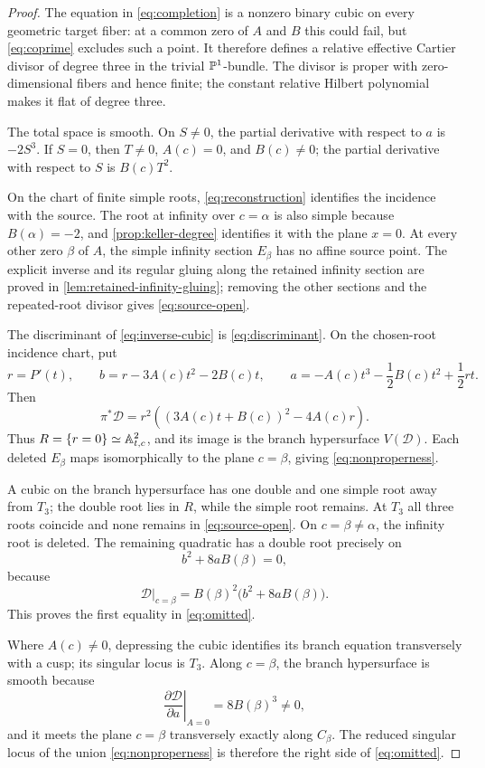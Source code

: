 \documentclass[11pt,reqno]{amsart}
\begin{document}
\begin{proof}
The equation in \eqref{eq:completion} is a nonzero binary cubic on every
geometric target fiber: at a common zero of \(A\) and \(B\) this could fail,
but \eqref{eq:coprime} excludes such a point.  It therefore defines a
relative effective Cartier divisor of degree three in the trivial
\(\mathbb P^1\)-bundle.  The divisor is proper with zero-dimensional fibers and
hence finite; the constant relative Hilbert polynomial makes it flat of
degree three.

The total space is smooth.  On \(S\ne0\), the partial derivative with
respect to \(a\) is \(-2S^3\).  If \(S=0\), then \(T\ne0\), \(A(c)=0\),
and \(B(c)\ne0\); the partial derivative with respect to \(S\) is
\(B(c)T^2\).

On the chart of finite simple roots, \eqref{eq:reconstruction} identifies
the incidence with the source.  The root at infinity over \(c=\alpha\) is
also simple because \(B(\alpha)=-2\), and
\cref{prop:keller-degree} identifies it with the plane \(x=0\).  At every
other zero \(\beta\) of \(A\), the simple infinity section \(E_\beta\) has
no affine source point.  The explicit inverse and its regular gluing along
the retained infinity section are proved in
\cref{lem:retained-infinity-gluing}; removing the other sections and the
repeated-root divisor gives \eqref{eq:source-open}.

The discriminant of \eqref{eq:inverse-cubic} is
\eqref{eq:discriminant}.  On the chosen-root incidence chart, put
\[
r=P'(t),\qquad
b=r-3A(c)t^2-2B(c)t,\qquad
a=-A(c)t^3-\frac12B(c)t^2+\frac12rt.
\]
Then
\begin{equation}
\label{eq:disc-pullback}
\pi^*\mathcal D
=r^2\left((3A(c)t+B(c))^2-4A(c)r\right).
\end{equation}
Thus \(R=\{r=0\}\simeq\mathbb A^2_{t,c}\), and its image is the branch
hypersurface \(V(\mathcal D)\).  Each deleted \(E_\beta\) maps
isomorphically to the plane \(c=\beta\), giving
\eqref{eq:nonproperness}.

A cubic on the branch hypersurface has one double and one simple root away
from \(T_3\); the double root lies in \(R\), while the simple root remains.
At \(T_3\) all three roots coincide and none remains in
\eqref{eq:source-open}.  On \(c=\beta\ne\alpha\), the infinity root is
deleted.  The remaining quadratic has a double root precisely on
\[
b^2+8aB(\beta)=0,
\]
because
\[
\mathcal D|_{c=\beta}
=B(\beta)^2\bigl(b^2+8aB(\beta)\bigr).
\]
This proves the first equality in \eqref{eq:omitted}.

Where \(A(c)\ne0\), depressing the cubic identifies its branch equation
transversely with a cusp; its singular locus is \(T_3\).  Along
\(c=\beta\), the branch hypersurface is smooth because
\[
\left.\frac{\partial\mathcal D}{\partial a}\right|_{A=0}
=8B(\beta)^3\ne0,
\]
and it meets the plane \(c=\beta\) transversely exactly along \(C_\beta\).
The reduced singular locus of the union \eqref{eq:nonproperness} is
therefore the right side of \eqref{eq:omitted}.
\end{proof}
\end{document}
